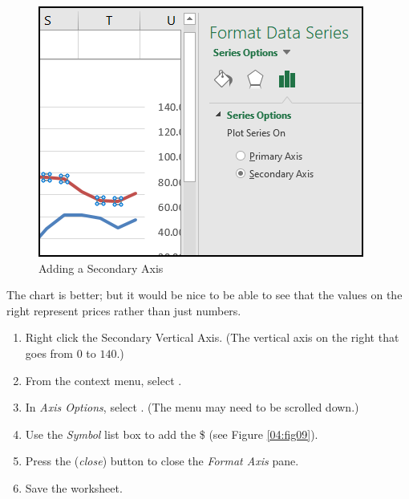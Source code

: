 \begin{figure}[H]
	\centering
	\includegraphics[width=\maxwidth{.75\linewidth}]{gfx/ch04_fig08}
	\caption{Adding a Secondary Axis}
	\label{04:fig08}
\end{figure}

The chart is better; but it would be nice to be able to see that the values on the right represent prices rather than just numbers.

\begin{enumbox}
	\begin{enumerate}
		\item Right click the Secondary Vertical Axis. (The vertical axis on the right that goes from $ 0 $ to $ 140 $.)
		\item From the context menu, select .
		\item In \textit{Axis Options}, select . (The menu may need to be scrolled down.)
		\item Use the \textit{Symbol} list box to add the \$ (see Figure \ref{04:fig09}).
		\item Press the  (\textit{close}) button to close the \textit{Format Axis} pane.
		\item Save the  worksheet.
	\end{enumerate}
\end{enumbox}
	
